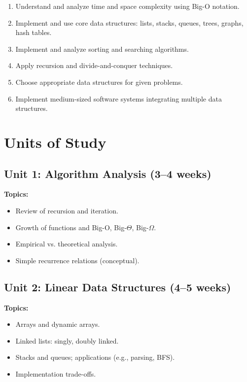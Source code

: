\documentclass[12pt,oneside]{book}
\begin{document}
\begin{enumerate}
    \item Understand and analyze time and space complexity using Big-O notation.
    \item Implement and use core data structures: lists, stacks, queues, trees, graphs, hash tables.
    \item Implement and analyze sorting and searching algorithms.
    \item Apply recursion and divide-and-conquer techniques.
    \item Choose appropriate data structures for given problems.
    \item Implement medium-sized software systems integrating multiple data structures.
\end{enumerate}

\section{Units of Study}

\subsection{Unit 1: Algorithm Analysis (3--4 weeks)}

\textbf{Topics:}
\begin{itemize}
    \item Review of recursion and iteration.
    \item Growth of functions and Big-O, Big-$\Theta$, Big-$\Omega$.
    \item Empirical vs. theoretical analysis.
    \item Simple recurrence relations (conceptual).
\end{itemize}

\subsection{Unit 2: Linear Data Structures (4--5 weeks)}

\textbf{Topics:}
\begin{itemize}
    \item Arrays and dynamic arrays.
    \item Linked lists: singly, doubly linked.
    \item Stacks and queues; applications (e.g., parsing, BFS).
    \item Implementation trade-offs.
\end{itemize}
\end{document}
